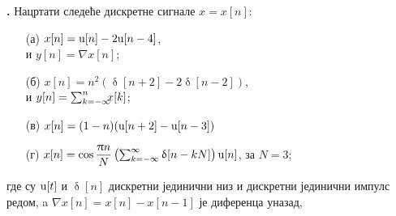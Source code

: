 \newpage
\noindent
\textbf{\ID.}
Нацртати следеће
дискретне сигнале $x=x[n]$:
\begin{multicols}{2}
\begin{enumerate}
\item[(а)] $x[n] = {\rm u}[n] - 2{\rm u}[n-4]$, \\ и 
$y[n] = \nabla x[n]$;
\item[(б)] $x[n] = n^2( \updelta[n+2] - 2\updelta[n-2] )$, \\ и 
$y[n] = \sum_{k = -\infty}^n \hspace*{-0.5em}
 x[k]$;
\item[(в)] $x[n] = (1-n)({\rm u}[n+2] - {\rm u}[n-3])$
\item[(г)]  $x[n] = \cos\dfrac{\uppi n}{N}  
\left(
\sum_{k = -\infty}^{\infty} \updelta[n-kN]
\right)  {\rm u}[n] $, за $N = 3$;
\end{enumerate}
\end{multicols}
\noindent
где су ${\rm u}[t]$ и $\updelta[n]$ дискретни 
јединични низ
и дискретни јединични импулс редом, a $\nabla x[n] = x[n] - x[n-1]$ је диференца уназад,
\vspace*{5mm}

